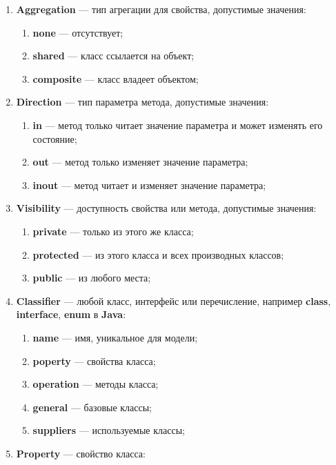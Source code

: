 \begin{enumerate}
\item \textbf{Aggregation} --- тип агрегации для свойства, допустимые значения:
    \begin{enumerate}
    \item \textbf{none} --- отсутствует;
    \item \textbf{shared} --- класс ссылается на объект;
    \item \textbf{composite} --- класс владеет объектом;
    \end{enumerate}
\item \textbf{Direction} --- тип параметра метода, допустимые значения:
    \begin{enumerate}
    \item \textbf{in} --- метод только читает значение параметра и может изменять его состояние;
    \item \textbf{out} --- метод только изменяет значение параметра;
    \item \textbf{inout} --- метод читает и изменяет значение параметра;
    \end{enumerate}
\item \textbf{Visibility} --- доступность свойства или метода, допустимые значения:
    \begin{enumerate}
    \item \textbf{private} --- только из этого же класса;
    \item \textbf{protected} --- из этого класса и всех производных классов;
    \item \textbf{public} --- из любого места;
    \end{enumerate}
\item \textbf{Classifier} --- любой класс, интерфейс или перечисление, например
\textbf{class}, \textbf{interface}, \textbf{enum} в \textbf{Java}:
    \begin{enumerate}
    \item \textbf{name} --- имя, уникальное для модели;
    \item \textbf{poperty} --- свойства класса;
    \item \textbf{operation} --- методы класса;
    \item \textbf{general} --- базовые классы;
    \item \textbf{suppliers} --- используемые классы;
    \end{enumerate}
\item \textbf{Property} --- свойство класса:
    \begin{enumerate}

\end{enumerate}
\end{enumerate}
